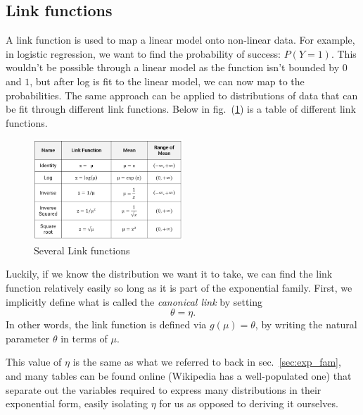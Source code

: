 \documentclass{article}
\begin{document}
\subsection{Link functions}
A link function is used to map a linear model onto non-linear data. For example, in logistic regression, we want to find the probability of success: $P(Y=1)$. This wouldn't be possible through a linear model as the function isn't bounded by $0$ and $1$, but after log is fit to the linear model, we can now map to the probabilities. The same approach can be applied to distributions of data that can be fit through different link functions. Below in fig.~(\ref{fig:link_fun}) is a table of different link functions.
\begin{figure}[H]
\centering
\includegraphics[width=0.5\textwidth]{images/link_functions.png}
\caption{Several Link functions} \label{fig:link_fun}
\end{figure}

Luckily, if we know the distribution we want it to take, we can find the link function relatively easily so long as it is part of the exponential family. First, we implicitly define what is called the \textit{canonical link} by setting
\begin{equation}
    \theta = \eta.
\end{equation}
In other words, the link function is defined via $g(\mu) = \theta$, by writing the natural parameter $\theta$ in terms of $\mu$.

This value of $\eta$ is the same as what we referred to back in sec.~\ref{sec:exp_fam}, and many tables can be found online (Wikipedia has a well-populated one) that separate out the variables required to express many distributions in their exponential form, easily isolating $\eta$ for us as opposed to deriving it ourselves.
\end{document}
